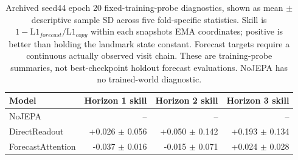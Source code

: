\begin{table}[t]
\centering
\small
\caption{Archived seed44 epoch 20 fixed-training-probe diagnostics, shown as mean $\pm$ descriptive sample SD across five fold-specific statistics. Skill is $1-\mathrm{L1}_{forecast}/\mathrm{L1}_{copy}$ within each snapshot\textquotesingle s EMA coordinates; positive is better than holding the landmark state constant. Forecast targets require a continuous actually observed visit chain. These are training-probe summaries, not best-checkpoint holdout forecast evaluations. NoJEPA has no trained-world diagnostic.}
\label{tab:worldprobe}
\begin{tabular}{lrrr}
\toprule
Model & Horizon 1 skill & Horizon 2 skill & Horizon 3 skill \\
\midrule
NoJEPA & -- & -- & -- \\
DirectReadout & +0.026 $\pm$ 0.056 & +0.050 $\pm$ 0.142 & +0.193 $\pm$ 0.134 \\
ForecastAttention & -0.037 $\pm$ 0.016 & -0.015 $\pm$ 0.071 & +0.024 $\pm$ 0.028 \\
\bottomrule
\end{tabular}
\end{table}
